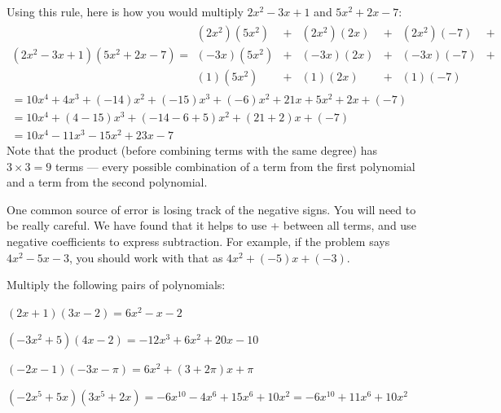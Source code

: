 Using this rule, here is how you would multiply $2x^2 - 3x + 1$ and
$5x^2 + 2x - 7$:
\begin{multline*}
  (2x^2 - 3x + 1)(5x^2 + 2x - 7)  = \begin{matrix}
  (2x^2)(5x^2)& + &(2x^2)(2x)& + &(2x^2)(-7)& + \\
  (-3x)(5x^2)& + &(-3x)(2x)& + &(-3x)(-7)& + \\
    (1)(5x^2)& + &(1)(2x)& + &(1)(-7)& 
  \end{matrix} \\
  = 10x^4 + 4x^3 + (-14)x^2 + (-15)x^3 + (-6)x^2 + 21x +5x^2 + 2x + (-7) \\
  = 10x^4 + (4 - 15)x^3 + (-14 - 6 + 5)x^2  + (21 + 2)x + (-7) \\
  = 10x^4 - 11x^3 - 15x^2 + 23x - 7
\end{multline*}
Note that the product (before combining terms with the same degree) has
$3 \times 3 = 9$ terms --- every possible combination of a term from the
first polynomial and a term from the second polynomial.

One common source of error is losing track of the negative
signs. You will need to be really careful. We have found that it
helps to use + between all terms, and use negative coefficients to
express subtraction. For example, if the problem says $4x^2 - 5x - 3$,
you should work with that as $4x^2 + (-5)x + (-3)$.

\begin{Exercise}[title={Multiplying polynomials}, label=multpolys]
  Multiply the following pairs of polynomials:
  \vspace{15mm}
  \vspace{15mm}
  \vspace{15mm}
  \vspace{15mm}

\end{Exercise}
\begin{Answer}[ref=multpolys]
  $(2x + 1)(3x - 2) = 6x^2 - x - 2$

  $(-3x^2 + 5)(4x - 2) = -12x^3 + 6x^2 + 20x - 10$

  $(-2x - 1)(-3x - \pi) = 6x^2 + (3 + 2\pi)x + \pi$ 

  $(-2x^5 + 5x)(3x^5 + 2x) = -6x^{10} - 4x^6 + 15x^6 + 10x^2 = -6x^{10} + 11x^6 + 10x^2$
\end{Answer}

